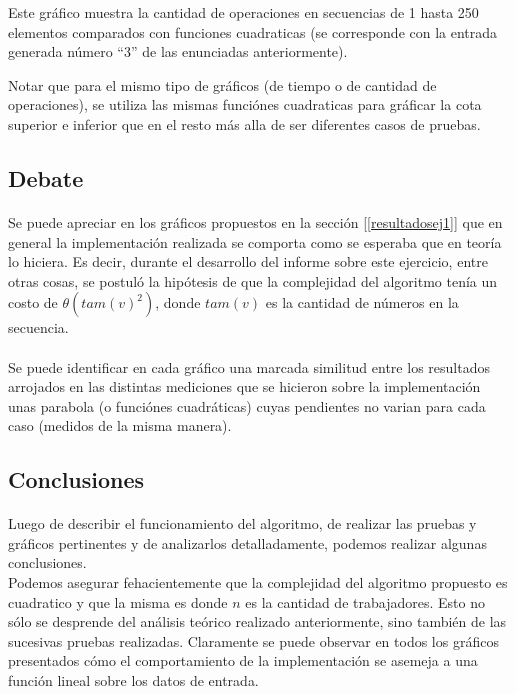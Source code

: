 Este gráfico muestra la cantidad de operaciones en secuencias de 1 hasta 250 elementos comparados con funciones cuadraticas (se corresponde con la entrada generada número ``3'' de las enunciadas anteriormente).

Notar que para el mismo tipo de gráficos (de tiempo o de cantidad de operaciones), se utiliza las mismas funciónes cuadraticas para gráficar la cota superior e inferior que en el resto más alla de ser diferentes casos de pruebas. 




\subsection{Debate}
\paragraph{}
Se puede apreciar en los gráficos propuestos en la sección [\ref{resultadosej1}] que en general la implementación realizada se comporta como se esperaba que en teoría lo hiciera. Es decir, durante el desarrollo del informe sobre este ejercicio, entre otras cosas, se postuló la hipótesis de que la complejidad del algoritmo tenía un costo de $\theta(tam(v)^2)$, donde $tam(v)$ es la cantidad de números en la secuencia.

\paragraph{}
Se puede identificar en cada gráfico una marcada similitud entre los resultados arrojados en las distintas mediciones que se hicieron sobre la implementación unas parabola (o funciónes cuadráticas) cuyas pendientes no varian para cada caso (medidos de la misma manera).


\paragraph{}


\subsection{Conclusiones}
\paragraph{}
Luego de describir el funcionamiento del algoritmo, de realizar las pruebas y gráficos pertinentes y de analizarlos detalladamente, podemos realizar algunas conclusiones.\\
Podemos asegurar fehacientemente que la complejidad del algoritmo propuesto es cuadratico y que la misma es  donde $n$ es la cantidad de trabajadores. Esto no sólo se desprende del análisis teórico realizado anteriormente, sino también de las sucesivas pruebas realizadas. Claramente se puede observar en todos los gráficos presentados cómo el comportamiento de la implementación se asemeja a una función lineal sobre los datos de entrada.

